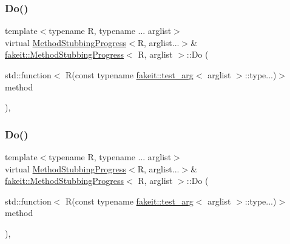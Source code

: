 \mbox{\label{structfakeit_1_1MethodStubbingProgress_a9ef4c2db8e567aa312b708613d240ae1}} 
\subsubsection{\texorpdfstring{Do()}{Do()}\hspace{0.1cm}{\footnotesize\ttfamily [15/27]}}
{\footnotesize\ttfamily template$<$typename R, typename ... arglist$>$ \\
virtual \mbox{\hyperlink{structfakeit_1_1MethodStubbingProgress}{Method\+Stubbing\+Progress}}$<$R, arglist...$>$\& \mbox{\hyperlink{structfakeit_1_1MethodStubbingProgress}{fakeit\+::\+Method\+Stubbing\+Progress}}$<$ R, arglist $>$\+::Do (\begin{DoxyParamCaption}\item[{std\+::function$<$ R(const typename \mbox{\hyperlink{structfakeit_1_1test__arg}{fakeit\+::test\+\_\+arg}}$<$ arglist $>$\+::type...)$>$}]{method }\end{DoxyParamCaption})\hspace{0.3cm}{\ttfamily [inline]}, {\ttfamily [virtual]}}

\mbox{\label{structfakeit_1_1MethodStubbingProgress_a9ef4c2db8e567aa312b708613d240ae1}} 
\subsubsection{\texorpdfstring{Do()}{Do()}\hspace{0.1cm}{\footnotesize\ttfamily [16/27]}}
{\footnotesize\ttfamily template$<$typename R, typename ... arglist$>$ \\
virtual \mbox{\hyperlink{structfakeit_1_1MethodStubbingProgress}{Method\+Stubbing\+Progress}}$<$R, arglist...$>$\& \mbox{\hyperlink{structfakeit_1_1MethodStubbingProgress}{fakeit\+::\+Method\+Stubbing\+Progress}}$<$ R, arglist $>$\+::Do (\begin{DoxyParamCaption}\item[{std\+::function$<$ R(const typename \mbox{\hyperlink{structfakeit_1_1test__arg}{fakeit\+::test\+\_\+arg}}$<$ arglist $>$\+::type...)$>$}]{method }\end{DoxyParamCaption})\hspace{0.3cm}{\ttfamily [inline]}, {\ttfamily [virtual]}}

